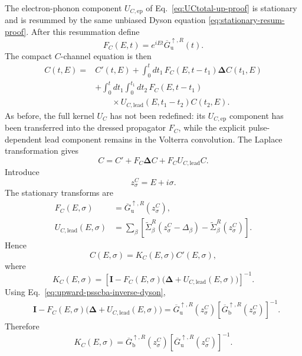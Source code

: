 \documentclass[
 reprint,
 superscriptaddress,
 amsmath,amssymb,
 aps,prb,
 longbibliography,
 floatfix
]{revtex4-2}
\newcommand{\ep}{\mathrm{ep}}
\newcommand{\lead}{\mathrm{lead}}
\begin{document}
The electron-phonon component $U_{C,\ep}$ of Eq.~\eqref{eq:UCtotal-up-proof} is stationary and is resummed by the same unbiased Dyson equation \eqref{eq:stationary-resum-proof}. After this resummation define
\begin{equation*}
F_C(E,t)
=
e^{iEt}\overline G_{\mathrm u}^{\uparrow,R}(t).
\end{equation*}
The compact $C$-channel equation is then
\begin{equation*}
\begin{aligned}
C(t,E)
={}&
C'(t,E)
+
\int_0^t dt_1\,
F_C(E,t-t_1)
\bm\Delta
C(t_1,E)
\\
&+
\int_0^t dt_1
\int_0^{t_1}dt_2\,
F_C(E,t-t_1)
\\
&\qquad\times
U_{C,\lead}(E,t_1-t_2)
C(t_2,E).
\end{aligned}
\end{equation*}
As before, the full kernel $U_C$ has not been redefined: its $U_{C,\ep}$ component has been transferred into the dressed propagator $F_C$, while the explicit pulse-dependent lead component remains in the Volterra convolution. The Laplace transformation gives
\begin{equation*}
C
=
C'
+
F_C\bm\Delta C
+
F_C U_{C,\lead}C.
\end{equation*}
Introduce
\begin{equation*}
z_\sigma^C
=
E+i\sigma.
\end{equation*}
The stationary transforms are
\begin{align*}
F_C(E,\sigma)
&=
\overline G_{\mathrm u}^{\uparrow,R}(z_\sigma^C),
\\
U_{C,\lead}(E,\sigma)
&=
\sum_\beta
\left[
\widetilde\Sigma_\beta^R(z_\sigma^C-\Delta_\beta)
-
\widetilde\Sigma_\beta^R(z_\sigma^C)
\right].
\end{align*}
Hence
\begin{equation*}
C(E,\sigma)
=
K_C(E,\sigma)
C'(E,\sigma),
\end{equation*}
where
\begin{equation*}
K_C(E,\sigma)
=
\left[
\bm I
-
F_C(E,\sigma)
\bigl(\bm\Delta+U_{C,\lead}(E,\sigma)\bigr)
\right]^{-1}.
\end{equation*}
Using Eq.~\eqref{eq:upward-psscba-inverse-dyson},
\begin{align*}
&\bm I
-
F_C(E,\sigma)
\bigl(\bm\Delta+U_{C,\lead}(E,\sigma)\bigr)
=
\overline G_{\mathrm u}^{\uparrow,R}(z_\sigma^C)
\left[
\overline G_{\mathrm b}^{\uparrow,R}(z_\sigma^C)
\right]^{-1}.
\end{align*}
Therefore
\begin{equation}
K_C(E,\sigma)
=
\overline G_{\mathrm b}^{\uparrow,R}(z_\sigma^C)
\left[
\overline G_{\mathrm u}^{\uparrow,R}(z_\sigma^C)
\right]^{-1}.
\label{eq:KC-resolvent}
\end{equation}
\end{document}
